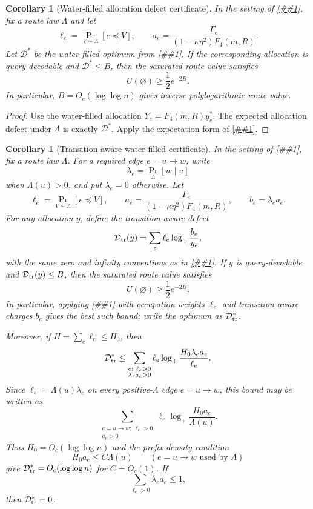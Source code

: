 \documentclass[10pt]{article}
\newcommand{\cref}[1]{\ref{##1}}
\newtheorem{corollary}[theorem]{Corollary}
\theoremstyle{definition}
\begin{document}
\begin{corollary}[Water-filled allocation defect certificate]
   \label{cor:waterfilled-allocation-defect}
   In the setting of \cref{cor:allocation-defect-toll}, fix a route law
   \(\Lambda\) and let
   \[
      \ell_e=\Pr_{V\sim\Lambda}[e\preceq V],
      \qquad
      a_e=\frac{\Gamma_e}{(1-\kappa\eta^2)F_4(m,R)} .
   \]
   Let \(\mathcal D^*\) be the water-filled optimum from
   \cref{lem:waterfilled-allocation}.  If the corresponding allocation is
   query-decodable and \(\mathcal D^*\le B\), then the saturated route value
   satisfies
   \[
      U(\varnothing)\ge \frac12e^{-2B}.
   \]
   In particular, \(B=O_c(\log\log n)\) gives inverse-polylogarithmic route
   value.
\end{corollary}

\begin{proof}
   Use the water-filled allocation \(Y_e=F_4(m,R)y_e^*\).  The expected
   allocation defect under \(\Lambda\) is exactly \(\mathcal D^*\).  Apply the
   expectation form of \cref{cor:allocation-defect-toll}.
\end{proof}

\begin{corollary}[Transition-aware water-filled certificate]
   \label{cor:transition-waterfilled-allocation}
   In the setting of \cref{cor:allocation-defect-toll}, fix a route law
   \(\Lambda\).  For a required edge \(e=u\to w\), write
   \[
      \lambda_e=\Pr_\Lambda[w\mid u]
   \]
   when \(\Lambda(u)>0\), and put \(\lambda_e=0\) otherwise.  Let
   \[
      \ell_e=\Pr_{V\sim\Lambda}[e\preceq V],
      \qquad
      a_e=\frac{\Gamma_e}{(1-\kappa\eta^2)F_4(m,R)},
      \qquad
      b_e=\lambda_ea_e .
   \]
   For any allocation \(y\), define the transition-aware defect
   \[
      \mathcal D_{\rm tr}(y)
      =
      \sum_e\ell_e\log_+\frac{b_e}{y_e},
   \]
   with the same zero and infinity conventions as in
   \cref{lem:waterfilled-allocation}.  If \(y\) is query-decodable and
   \(\mathcal D_{\rm tr}(y)\le B\), then the saturated route value satisfies
   \[
      U(\varnothing)\ge \frac12e^{-2B}.
   \]
   In particular, applying \cref{lem:waterfilled-allocation} with occupation
   weights \(\ell_e\) and transition-aware charges \(b_e\) gives the best such
   bound; write the optimum as \(\mathcal D^*_{\rm tr}\).

   Moreover, if \(H=\sum_e\ell_e\le H_0\), then
   \[
      \mathcal D^*_{\rm tr}
      \le
      \sum_{\substack{e:\ \ell_e>0\\ \lambda_ea_e>0}}
      \ell_e\log_+\frac{H_0\lambda_ea_e}{\ell_e}.
   \]
   Since \(\ell_e=\Lambda(u)\lambda_e\) on every positive-\(\Lambda\) edge
   \(e=u\to w\), this bound may be written as
   \[
      \sum_{\substack{e=u\to w:\ \ell_e>0\\ a_e>0}}
      \ell_e\log_+\frac{H_0a_e}{\Lambda(u)}.
   \]
   Thus \(H_0=O_c(\log\log n)\) and the prefix-density condition
   \[
      H_0a_e\le C\Lambda(u)
      \qquad(e=u\to w\text{ used by }\Lambda)
   \]
   give \(\mathcal D^*_{\rm tr}=O_c(\log\log n)\) for \(C=O_c(1)\).  If
   \[
      \sum_{\ell_e>0}\lambda_ea_e\le1,
   \]
   then \(\mathcal D^*_{\rm tr}=0\).
\end{corollary}
\end{document}

